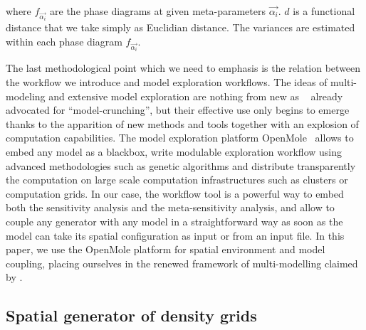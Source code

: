 \documentclass[Royal,sageh,times]{sagej}
\begin{document}
where $f_{\vec{\alpha_i}}$ are the phase diagrams at given meta-parameters $\vec{\alpha_i}$. $d$ is a functional distance that we take simply as Euclidian distance. The variances are estimated within each phase diagram $f_{\vec{\alpha_i}}$.


The last methodological point which we need to emphasis is the relation between the workflow we introduce and model exploration workflows. The ideas of multi-modeling and extensive model exploration are nothing from new as ~\cite{openshaw1983data} already advocated for ``model-crunching'', but their effective use only begins to emerge thanks to the apparition of new methods and tools together with an explosion of computation capabilities. The model exploration platform OpenMole~\citep{reuillon2013openmole} allows to embed any model as a blackbox, write modulable exploration workflow using advanced methodologies such as genetic algorithms and distribute transparently the computation on large scale computation infrastructures such as clusters or computation grids. In our case, the workflow tool is a powerful way to embed both the sensitivity analysis and the meta-sensitivity analysis, and allow to couple any generator with any model in a straightforward way as soon as the model can take its spatial configuration as input or from an input file. In this paper, we use the OpenMole platform for spatial environment and model coupling, placing ourselves in the renewed framework of multi-modelling claimed by \citet{cottineau2015modular}.
\subsection{Spatial generator of density grids}
\end{document}

